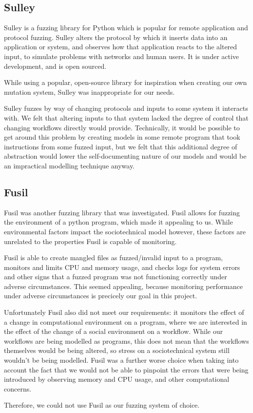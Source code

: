 \documentclass[a4paper]{l4proj}
\begin{document}
\begin{itemize}
\subsection{Sulley}
\label{fuzzing_sulley}
Sulley is a fuzzing library for Python which is popular for remote application and protocol fuzzing. Sulley alters the protocol by which it inserts data into an application or system, and observes how that application reacts to the altered input, to simulate problems with networks and human users. It is under active development, and is open sourced.\par
While using a popular, open-source library for inspiration when creating our own mutation system, Sulley was inappropriate for our needs.\par
Sulley fuzzes by way of changing protocols and inputs to some system it interacts with. We felt that altering inputs to that system lacked the degree of control that changing workflows directly would provide. Technically, it would be possible to get around this problem by creating models in some remote program that took instructions from some fuzzed input, but we felt that this additional degree of abstraction would lower the self-documenting nature of our models and would be an impractical modelling technique anyway. \par

\subsection{Fusil}
\label{fuzzing_fuzil}
Fusil was another fuzzing library that was investigated. Fusil allows for fuzzing the environment of a python program, which made it appealing to us. While environmental factors impact the sociotechnical model however, these factors are unrelated to the properties Fusil is capable of monitoring. \par
Fusil is able to create mangled files as fuzzed/invalid input to a program, monitors and limits CPU and memory usage, and checks logs for system errors and other signs that a fuzzed program was not functioning correctly under adverse circumstances. This seemed appealing, because monitoring performance under adverse circumstances is precicely our goal in this project. \par
Unfortunately Fusil also did not meet our requirements: it monitors the effect of a change in computational environment on a program, where we are interested in the effect of the change of a social environment on a workflow. While our workflows are being modelled as programs, this does not mean that the workflows themselves would be being altered, so stress on a sociotechnical system still wouldn't be being modelled. Fusil was a further worse choice when taking into account the fact that we would not be able to pinpoint the errors that were being introduced by observing memory and CPU usage, and other computational concerns. \par
Therefore, we could not use Fusil as our fuzzing system of choice. \par


\end{itemize}
\end{document}
